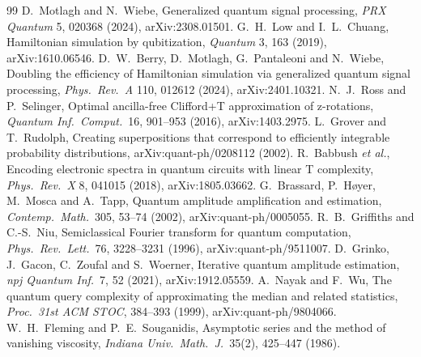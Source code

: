 \documentclass[11pt,a4paper]{article}
\theoremstyle{remark}
\begin{document}
\begin{thebibliography}{99}
 D.~Motlagh and N.~Wiebe, Generalized quantum signal processing, \emph{PRX Quantum} 5, 020368 (2024), arXiv:2308.01501.
 G.~H.~Low and I.~L.~Chuang, Hamiltonian simulation by qubitization, \emph{Quantum} 3, 163 (2019), arXiv:1610.06546.
 D.~W.~Berry, D.~Motlagh, G.~Pantaleoni and N.~Wiebe, Doubling the efficiency of Hamiltonian simulation via generalized quantum signal processing, \emph{Phys.~Rev.~A} 110, 012612 (2024), arXiv:2401.10321.
 N.~J.~Ross and P.~Selinger, Optimal ancilla-free Clifford+T approximation of z-rotations, \emph{Quantum Inf.~Comput.}~16, 901--953 (2016), arXiv:1403.2975.
 L.~Grover and T.~Rudolph, Creating superpositions that correspond to efficiently integrable probability distributions, arXiv:quant-ph/0208112 (2002).
 R.~Babbush \emph{et al.}, Encoding electronic spectra in quantum circuits with linear T complexity, \emph{Phys.~Rev.~X} 8, 041015 (2018), arXiv:1805.03662.
 G.~Brassard, P.~H\o yer, M.~Mosca and A.~Tapp, Quantum amplitude amplification and estimation, \emph{Contemp.~Math.}~305, 53--74 (2002), arXiv:quant-ph/0005055.
 R.~B.~Griffiths and C.-S.~Niu, Semiclassical Fourier transform for quantum computation, \emph{Phys.~Rev.~Lett.}~76, 3228--3231 (1996), arXiv:quant-ph/9511007.
 D.~Grinko, J.~Gacon, C.~Zoufal and S.~Woerner, Iterative quantum amplitude estimation, \emph{npj Quantum Inf.}~7, 52 (2021), arXiv:1912.05559.
 A.~Nayak and F.~Wu, The quantum query complexity of approximating the median and related statistics, \emph{Proc.~31st ACM STOC}, 384--393 (1999), arXiv:quant-ph/9804066.
 W.~H.~Fleming and P.~E.~Souganidis, Asymptotic series and the method of vanishing viscosity, \emph{Indiana Univ.~Math.~J.}~35(2), 425--447 (1986).
\end{thebibliography}
\end{document}
